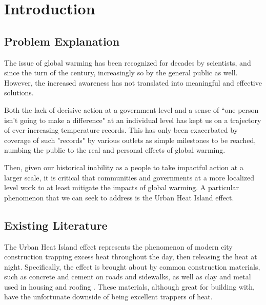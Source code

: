 \documentclass[11pt]{article}
\begin{document}

\tableofcontents

\section{Introduction}
\subsection{Problem Explanation}
The issue of global warming has been recognized for decades by scientists, and since the turn of the century, increasingly so by the general public as well. However, the increased awareness has not translated into meaningful and effective solutions.

Both the lack of decisive action at a government level and a sense of ``one person isn't going to make a difference" at an individual level has kept us on a trajectory of ever-increasing temperature records. This has only been exacerbated by coverage of such "records" by various outlets as simple milestones to be reached, numbing the public to the real and personal effects of global warming.

Then, given our historical inability as a people to take impactful action at a larger scale, it is critical that communities and governments at a more localized level work to at least mitigate the impacts of global warming. A particular phenomenon that we can seek to address is the Urban Heat Island effect.

\subsection{Existing Literature}
The Urban Heat Island effect represents the phenomenon of modern city construction trapping excess heat throughout the day, then releasing the heat at night. Specifically, the effect is brought about by common construction materials, such as concrete and cement on roads and sidewalks, as well as clay and metal used in housing and roofing \cite{kim_2007}. These materials, although great for building with, have the unfortunate downside of being excellent trappers of heat.
\end{document}
